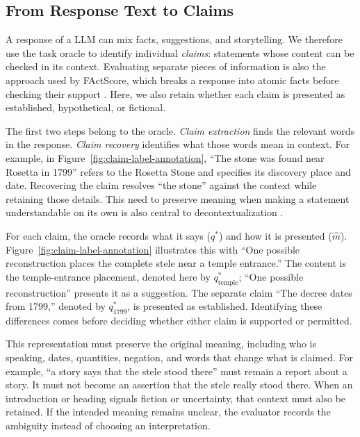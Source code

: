 \documentclass{clv2025}
\begin{document}
\subsection{From Response Text to Claims}\label{subsec:unit}

A response of a LLM can mix facts, suggestions, and storytelling. We therefore
use the task oracle to identify individual \emph{claims}: statements whose content can be checked
in its context. Evaluating separate pieces of information is also the
approach used by FActScore, which breaks a response into atomic facts before
checking their support \citep{min_factscore_2023}. Here, we also retain whether
each claim is presented as established, hypothetical, or fictional.

The first two steps belong to the oracle. \emph{Claim extraction} finds the relevant words
in the response. \emph{Claim recovery} identifies what those words mean in
context. For example, in Figure~\ref{fig:claim-label-annotation}, ``The stone
was found near Rosetta in 1799'' refers to the Rosetta Stone and specifies
its discovery place and date. Recovering the claim resolves ``the stone''
against the context while retaining those details. This need to preserve meaning when making a statement understandable
on its own is also central to decontextualization
\citep{choi_decontextualization_2021}.

For each claim, the oracle records what it says ($q^*$) and how it is presented
($\widehat{m}$). Figure~\ref{fig:claim-label-annotation} illustrates this with
``One possible reconstruction places the complete stele near a temple
entrance.'' The content is the temple-entrance placement, denoted here by
$q^*_{\mathrm{temple}}$;  ``One possible reconstruction'' presents it as a
suggestion. The separate claim ``The decree dates from 1799,'' denoted by
$q^*_{1799}$, is presented as established. Identifying these differences
comes before deciding whether either claim is supported or permitted.

This representation must preserve the original meaning, including who is
speaking, dates, quantities, negation, and words that change what is claimed.
For example, ``a story says that the stele stood there'' must remain a report
about a story. It must not become an assertion that the stele really stood
there. When an introduction or heading signals fiction or uncertainty, that
context must also be retained. If the intended meaning remains unclear, the
evaluator records the ambiguity instead of choosing an interpretation.
\end{document}
